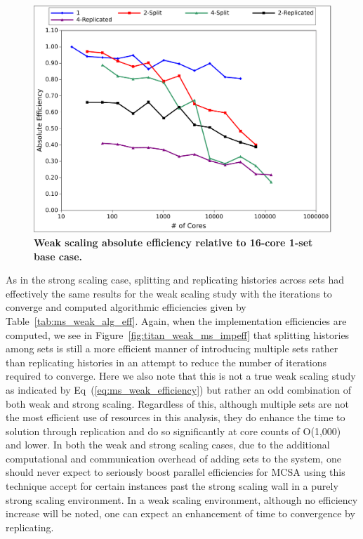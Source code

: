 \begin{figure}[t!]
  \begin{center}
    \includegraphics[width=6in]{chapters/parallel_mc/titan_weak_ms_eff.pdf}
  \end{center}
  \caption{\textbf{Weak scaling absolute efficiency relative to
      16-core 1-set base case.}}
  \label{fig:titan_weak_ms_eff}
\end{figure}

As in the strong scaling case, splitting and replicating histories
across sets had effectively the same results for the weak scaling
study with the iterations to converge and computed algorithmic
efficiencies given by Table~\ref{tab:ms_weak_alg_eff}. Again, when the
implementation efficiencies are computed, we see in
Figure~\ref{fig:titan_weak_ms_impeff} that splitting histories among
sets is still a more efficient manner of introducing multiple sets
rather than replicating histories in an attempt to reduce the number
of iterations required to converge.  Here we also note that this is
not a true weak scaling study as indicated by
Eq~(\ref{eq:ms_weak_efficiency}) but rather an odd combination of both
weak and strong scaling. Regardless of this, although multiple sets
are not the most efficient use of resources in this analysis, they do
enhance the time to solution through replication and do so
significantly at core counts of O(1,000) and lower. In both the weak
and strong scaling cases, due to the additional computational and
communication overhead of adding sets to the system, one should never
expect to seriously boost parallel efficiencies for MCSA using this
technique accept for certain instances past the strong scaling wall in
a purely strong scaling environment. In a weak scaling environment,
although no efficiency increase will be noted, one can expect an
enhancement of time to convergence by replicating.

